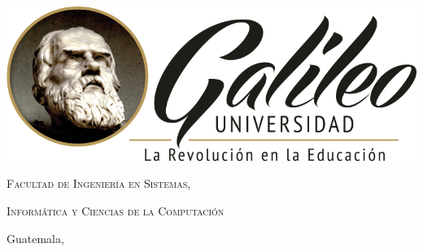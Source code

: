 \documentclass[
12pt, %
spanish, %
doublespacing, %
liststotoc, %
parskip, %
headsepline, %
table,
]{MastersDoctoralThesis} %
\author{José Jacobo \textsc{Del Valle Girón}} %
\begin{document}
\frontmatter %

\pagestyle{plain} %


\begin{titlepage}
\begin{center}

\begingroup\onehalfspacing

{\scshape\LARGE \authorname\par}\vspace{1.5cm} %

{\huge \bfseries \ttitle\par} %

\vspace{1.5cm}

\includegraphics[scale=0.5]{logo.png} %

\vspace{1.5cm}

{\scshape\Large \univname\par}
{\scshape\Large Facultad de Ingeniería en Sistemas,}
{\scshape\Large Informática y Ciencias de la Computación\par}
{\scshape \Large \bfseries \par Guatemala, \the\year}

\endgroup
 
\vfill
\end{center}
\end{titlepage}

\end{document}

